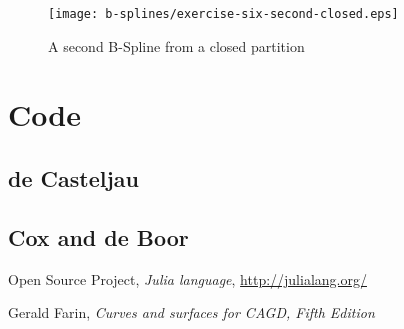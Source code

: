 \documentclass{article}
\begin{document}
\begin{figure}
  \centering
  \texttt{[image: b-splines/exercise-six-second-closed.eps]}
  \caption{A second B-Spline from a closed partition }
  \label{fig:bspline-exercise-six-second}
\end{figure}


\section{Code}

\subsection{de Casteljau}
\label{sec:deCasteljau-code}


\subsection{Cox and de Boor}
\label{sec:Cox-deBoor-code}


\newpage

\begin{thebibliography}{}

 Open Source Project,
  \emph{Julia language}, \url{http://julialang.org/}

 Gerald Farin,
  \textit{Curves and surfaces for CAGD, Fifth Edition}


\end{thebibliography}
\end{document}
